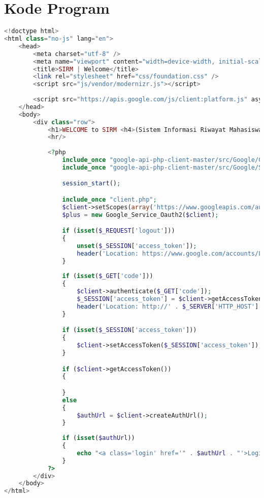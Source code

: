 \chapter{Kode Program}
\label{kode_program}

\singlespacing 
%
%
\begin{lstlisting}[language=php,basicstyle=\tiny,caption=index.php]
<!doctype html>
<html class="no-js" lang="en">
	<head>
		<meta charset="utf-8" />
		<meta name="viewport" content="width=device-width, initial-scale=1.0" />
		<title>SIRM | Welcome</title>
		<link rel="stylesheet" href="css/foundation.css" />
		<script src="js/vendor/modernizr.js"></script>
		
		<script src="https://apis.google.com/js/client:platform.js" async defer></script>
	</head>
	<body>
		<div class="row">
			<h1>WELCOME to SIRM <h4>(Sistem Informasi Riwayat Mahasiswa)</h4></h1>
			<hr/>
			
			<?php
				include_once "google-api-php-client-master/src/Google/Client.php";
				include_once "google-api-php-client-master/src/Google/Service/Oauth2.php";

				session_start();

				include_once "client.php";
				$client->setScopes(array('https://www.googleapis.com/auth/plus.login','email'));
				$plus = new Google_Service_Oauth2($client);

				if (isset($_REQUEST['logout']))
				{
					unset($_SESSION['access_token']);
					header('Location: https://www.google.com/accounts/Logout?continue=https://appengine.google.com/_ah/logout?continue=http://' . $_SERVER['HTTP_HOST'] . $_SERVER['PHP_SELF']);
				}
			
				if (isset($_GET['code']))
				{
					$client->authenticate($_GET['code']);
					$_SESSION['access_token'] = $client->getAccessToken();
					header('Location: http://' . $_SERVER['HTTP_HOST'] . $_SERVER['PHP_SELF']);
				}

				if (isset($_SESSION['access_token']))
				{
					$client->setAccessToken($_SESSION['access_token']);
				}

				if ($client->getAccessToken()) 
				{

				}
				else
				{
					$authUrl = $client->createAuthUrl();
				}
				
				if (isset($authUrl))
				{
					echo "<a class='login' href='" . $authUrl . "'>Login with Google</a>";
				}
			?>
		</div>
	</body>
</html>
\end{lstlisting}

